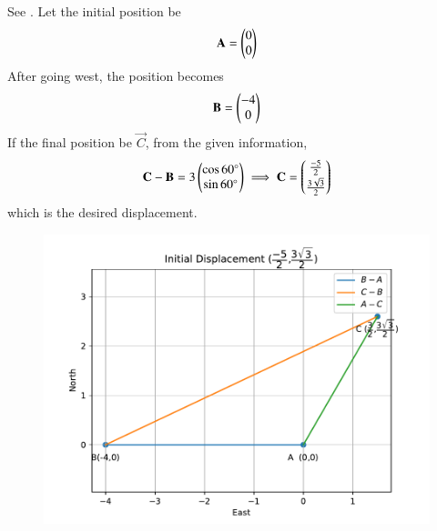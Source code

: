 See  
.
Let the initial position
be
\begin{align}
	\mathbf{A}=\begin{pmatrix}0\\0\end{pmatrix}
\end{align}
After going west, the position becomes
\begin{align}
			\mathbf{B}=\begin{pmatrix}-4\\0\end{pmatrix}
\end{align}
If the final position be $\vec{C}$, from the given information,
\begin{align}
	 \mathbf{C}-\mathbf{B}=3\begin{pmatrix}\cos{60\degree}\\\sin{60\degree}\end{pmatrix}
	 \implies 
	\mathbf{C}  
=\begin{pmatrix}\frac{-5}{2}\\[2pt] \frac{3\sqrt{3}}{2}\end{pmatrix}
\end{align}
which is the desired displacement. 
\begin{figure}[!h] 
 \begin{center} 
 \includegraphics[width=\columnwidth]{chapters/12/10/5/3/figs/fig.pdf} 
 \end{center} 
\caption{} 
\label{fig:chapters/12/10/5/3Fig1} 
\end{figure}
